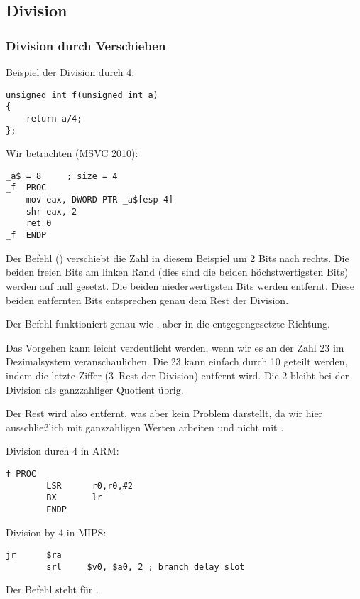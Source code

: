 \subsection{Division}

\subsubsection{Division durch Verschieben}
\label{division_by_shifting}

Beispiel der Division durch 4:

\begin{lstlisting}[style=customc]
unsigned int f(unsigned int a)
{
	return a/4;
};
\end{lstlisting}

Wir betrachten (MSVC 2010):

\begin{lstlisting}[caption=MSVC 2010,style=customasmx86]
_a$ = 8		; size = 4
_f	PROC
	mov	eax, DWORD PTR _a$[esp-4]
	shr	eax, 2
	ret	0
_f	ENDP
\end{lstlisting}

\label{SHR}

Der Befehl \SHR () verschiebt die Zahl in diesem Beispiel um 2
Bits nach rechts. Die beiden freien Bits am linken Rand (dies sind die beiden
höchstwertigsten Bits) werden auf null gesetzt. 
Die beiden niederwertigsten Bits werden entfernt. 
Diese beiden entfernten Bits entsprechen genau dem Rest der Division.


Der \SHR Befehl funktioniert genau wie \SHL, aber in die entgegengesetzte
Richtung.


Das Vorgehen kann leicht verdeutlicht werden, wenn wir es an der Zahl 23 im
Dezimalsystem veranschaulichen. Die 23 kann einfach durch 10 geteilt werden,
indem die letzte Ziffer (3--Rest der Division) entfernt wird. Die 2 bleibt bei
der Division als ganzzahliger \gls{Quotient} übrig.

Der Rest wird also entfernt, was aber kein Problem darstellt, da wir hier
ausschließlich mit ganzzahligen Werten arbeiten und nicht mit .

Division durch 4 in ARM:

\begin{lstlisting}[caption=\NonOptimizingKeilVI (\ARMMode),style=customasmARM]
f PROC
        LSR      r0,r0,#2
        BX       lr
        ENDP
\end{lstlisting}

Division by 4 in MIPS:

\begin{lstlisting}[caption=\Optimizing GCC 4.4.5 (IDA),style=customasmMIPS]
        jr      $ra
        srl     $v0, $a0, 2 ; branch delay slot
\end{lstlisting}

Der Befehl \SRL steht für .
